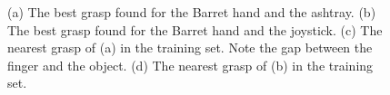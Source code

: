 \begin{figure}
  \centering

 \caption{\scriptsize{(a) The best grasp found for the Barret hand and the ashtray. (b) The best grasp found for the Barret hand and the joystick. (c) The nearest grasp of (a) in the training set. Note the gap between the finger and the object. (d) The nearest grasp of (b) in the training set. }
}
    \label{near}
\end{figure}



